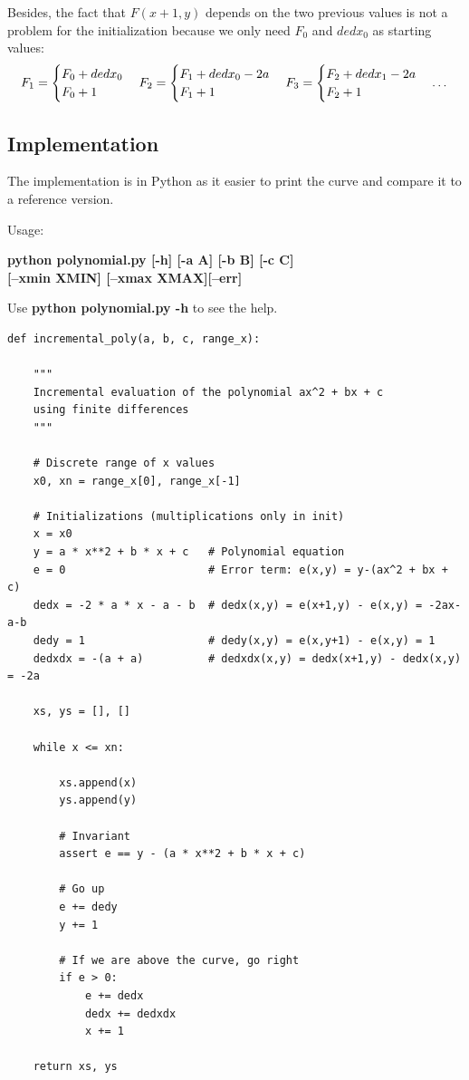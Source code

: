 \documentclass[a4paper,10pt]{article}
\begin{document}
\noindent
Besides, the fact that $F(x + 1, y)$ depends on the two previous values is not a problem for the initialization because we only need $F_0$ and $dedx_0$ as starting values:
\begin{equation}
	F_1 =
	\begin{cases}
	F_0 + dedx_0 \\
	F_0 + 1
	\end{cases}
	F_2 =
	\begin{cases}
	F_1 + dedx_0 -2a\\
	F_1 + 1
	\end{cases}
	F_3 =
	\begin{cases}
	F_2 + dedx_1 -2a\\
	F_2 + 1
	\end{cases}
	\text{\dots}
\end{equation}

\bigskip
\subsection{Implementation}

The implementation is in Python as it easier to print the curve and compare it to a reference version.
\bigskip

\noindent
Usage:
\begin{center}
\textbf{python polynomial.py [-h] [-a A] [-b B] [-c C]} \\
\textbf{[--xmin XMIN] [--xmax XMAX][--err]}
\end{center}
\bigskip
Use \textbf{python polynomial.py -h} to see the help.

\newpage
\begin{lstlisting}
def incremental_poly(a, b, c, range_x):

    """
    Incremental evaluation of the polynomial ax^2 + bx + c
    using finite differences
    """

    # Discrete range of x values
    x0, xn = range_x[0], range_x[-1]

    # Initializations (multiplications only in init)
    x = x0
    y = a * x**2 + b * x + c   # Polynomial equation
    e = 0                      # Error term: e(x,y) = y-(ax^2 + bx + c)
    dedx = -2 * a * x - a - b  # dedx(x,y) = e(x+1,y) - e(x,y) = -2ax-a-b
    dedy = 1                   # dedy(x,y) = e(x,y+1) - e(x,y) = 1
    dedxdx = -(a + a)          # dedxdx(x,y) = dedx(x+1,y) - dedx(x,y) = -2a

    xs, ys = [], []

    while x <= xn:

        xs.append(x)
        ys.append(y)

        # Invariant
        assert e == y - (a * x**2 + b * x + c)

        # Go up
        e += dedy
        y += 1

        # If we are above the curve, go right
        if e > 0:
            e += dedx
            dedx += dedxdx
            x += 1

    return xs, ys
\end{lstlisting}
\end{document}
